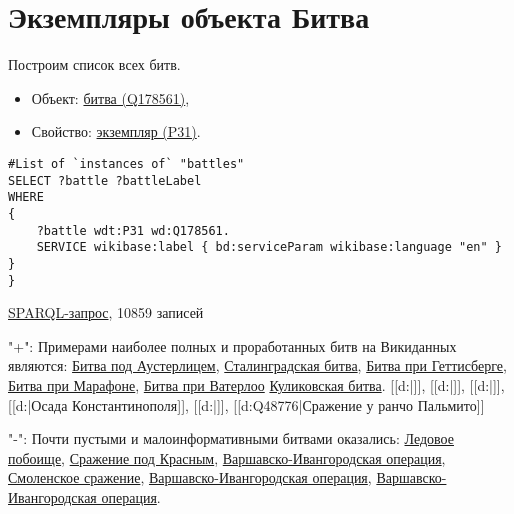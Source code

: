 \section{Экземпляры объекта Битва}

Построим список всех битв.

\begin{itemize}
    \item Объект: \href{https://www.wikidata.org/wiki/Q178561}{битва (Q178561)},
    \item Свойство: \href{https://www.wikidata.org/wiki/Property:P31}{экземпляр (P31)}.
\end{itemize}

\begin{lstlisting}[language=SPARQL]
#List of `instances of` "battles" 
SELECT ?battle ?battleLabel
WHERE
{
    ?battle wdt:P31 wd:Q178561.
    SERVICE wikibase:label { bd:serviceParam wikibase:language "en" }
}
}

\end{lstlisting}

\href{https://query.wikidata.org/#%23added%202017-02%0A%23List%20of%20%60instances%20of%60%20%22national%20park%22%20%0ASELECT%20%3Fbattle%20%3FbattleLabel%0AWHERE%0A%7B%0A%20%20%20%20%3Fbattle%20wdt%3AP31%20wd%3AQ178561.%0A%20%20%20%20SERVICE%20wikibase%3Alabel%20%7B%20bd%3AserviceParam%20wikibase%3Alanguage%20%22en%22%20%7D%0A%7D}{SPARQL-запрос}, 10859 записей

"+": Примерами наиболее полных и проработанных битв на Викиданных являются:
\href{https://www.wikidata.org/wiki/Q134114}{Битва под Аустерлицем}, 
\href{https://www.wikidata.org/wiki/Q38789}{Сталинградская битва},
\href{https://www.wikidata.org/wiki/Q33132}{Битва при Геттисберге},
\href{https://www.wikidata.org/wiki/Q31900}{Битва при Марафоне},
\href{https://www.wikidata.org/wiki/Q48314}{Битва при Ватерлоо}
\href{https://www.wikidata.org/wiki/Q210354}{Куликовская битва}.
[[d:|]], [[d:|]], [[d:|]], [[d:|Осада Константинополя]],  [[d:|]], [[d:Q48776|Сражение у ранчо Пальмито]]

"-": Почти пустыми и малоинформативными битвами оказались:
\href{https://www.wikidata.org/wiki/Q14689}{Ледовое побоище},
\href{https://www.wikidata.org/wiki/Q25809}{Сражение под Красным},
\href{https://www.wikidata.org/wiki/Q28205}{Варшавско-Ивангородская операция},
\href{https://www.wikidata.org/wiki/Q1071578}{Смоленское сражение},
\href{https://www.wikidata.org/wiki/Q28205}{Варшавско-Ивангородская операция},
\href{https://www.wikidata.org/wiki/Q28205}{Варшавско-Ивангородская операция}.
